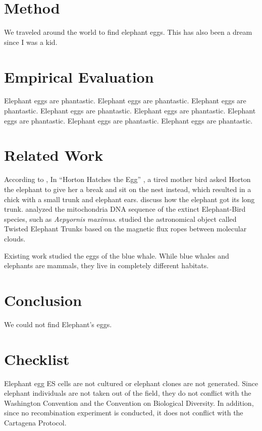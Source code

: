 \section{Method}

We traveled around the world to find elephant eggs. This has also been a dream since I was a kid. 

\section{Empirical Evaluation}

Elephant eggs are phantastic. 
Elephant eggs are phantastic. 
Elephant eggs are phantastic. 
Elephant eggs are phantastic. 
Elephant eggs are phantastic. 
Elephant eggs are phantastic. 
Elephant eggs are phantastic. 
Elephant eggs are phantastic. 

\section{Related Work}

According to \citet{folbre1997future},
In ``Horton Hatches the Egg'' \cite{seuss1968horton},
a tired mother bird asked Horton the elephant to give her a break and
sit on the nest instead, which resulted in a chick with a small trunk and
elephant ears.
\citet{kipling1983elephant} discuss how the elephant got its long trunk.
\citet{cooper2001complete} analyzed the mitochondria DNA sequence of the extinct Elephant-Bird species,
such as \emph{Aepyornis maximus}.
\citet{carlqvist2003theory} studied the astronomical object called Twisted Elephant Trunks
based on the magnetic flux ropes between molecular clouds.

Existing work studied the eggs of the blue whale.
While blue whales and elephants are mammals, they live in completely different habitats.

\section{Conclusion}

We could not find Elephant's eggs.

\section*{Checklist}

Elephant egg ES cells are not cultured or elephant clones are not
generated. Since elephant individuals are not taken out of the field,
they do not conflict with the Washington Convention and the Convention
on Biological Diversity. In addition, since no recombination experiment
is conducted, it does not conflict with the Cartagena Protocol.

